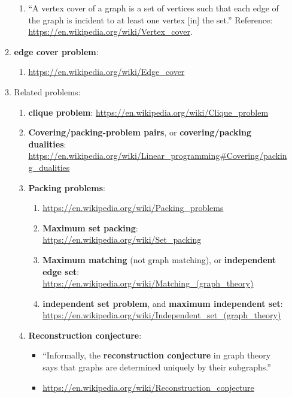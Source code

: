 \begin{enumerate}
\begin{enumerate}
\begin{enumerate}
		\item ``A vertex cover of a graph is a set of vertices such that each edge of the graph is incident to at least one vertex [in] the set.'' Reference: \url{https://en.wikipedia.org/wiki/Vertex_cover}.
		\end{enumerate}
	\item {\bf edge cover problem}: \vspace{-0.2cm}
		\begin{enumerate} \itemsep -2pt
		\item \url{https://en.wikipedia.org/wiki/Edge_cover}
		\end{enumerate}
	\item Related problems: %
		\begin{enumerate} %
		\item {\bf clique problem}: \url{https://en.wikipedia.org/wiki/Clique_problem}
		\item {\Large  {\bf Covering/packing-problem pairs}, or {\bf covering/packing dualities}}: \url{https://en.wikipedia.org/wiki/Linear_programming#Covering/packing_dualities}
		\item {\bf Packing problems}: \vspace{-0.1cm}
			\begin{enumerate} \itemsep -1pt
			\item \url{https://en.wikipedia.org/wiki/Packing_problems}
			\item {\bf Maximum set packing}: \url{https://en.wikipedia.org/wiki/Set_packing}
			\item {\bf Maximum matching} (not graph matching), or {\bf independent edge set}: \url{https://en.wikipedia.org/wiki/Matching_(graph_theory)}
			\item {\bf independent set problem}, and {\bf maximum independent set}: \url{https://en.wikipedia.org/wiki/Independent_set_(graph_theory)}
			\end{enumerate}
		\item {\bf Reconstruction conjecture}: \vspace{-0.1cm}
			\begin{itemize} \itemsep -1pt
			\item ``Informally, the {\bf reconstruction conjecture} in graph theory says that graphs are determined uniquely by their subgraphs.''
			\item \url{https://en.wikipedia.org/wiki/Reconstruction_conjecture}
			\end{itemize}

\end{enumerate}
\end{enumerate}
\end{enumerate}
